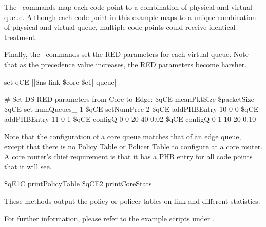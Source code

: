 The~ commands map each code point to 
  a combination of physical and virtual queue.
Although each code point in this example maps to 
  a unique combination of physical and virtual queue,
  multiple code points could receive identical treatment.

Finally, the~ commands set the RED parameters for 
  each virtual queue.  
Note that as the precedence value increases, 
  the RED parameters become harsher.

\begin{program}

set qCE [[\$ns link \$core \$e1] queue]

# Set DS RED parameters from Core to Edge:
\$qCE meanPktSize \$packetSize
\$qCE set numQueues_ 1
\$qCE setNumPrec 2
\$qCE addPHBEntry 10 0 0
\$qCE addPHBEntry 11 0 1
\$qCE configQ 0 0 20 40 0.02
\$qCE configQ 0 1 10 20 0.10

\end{program}

Note that the configuration of a core queue matches that of an edge queue, 
  except that there is no Policy Table or Policer Table to 
  configure at a core router.  
A core router's chief requirement is that it has a PHB entry for 
  all code points that it will see.

\begin{program}
\$qE1C printPolicyTable
\$qCE2 printCoreStats
\end{program}

These methods output the policy or policer tables on link and different 
  statistics.  

For further information, please refer to the example scripts under 
.
